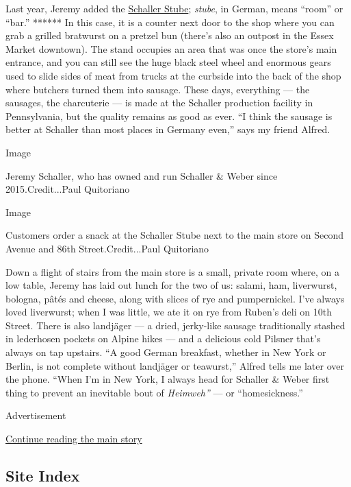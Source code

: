 Last year, Jeremy added the
\href{https://www.nytimes3xbfgragh.onion/2015/11/04/dining/hungry-city-schallers-stube-yorkville.html}{Schaller
Stube}; \emph{stube}, in German, means ``room'' or ``bar.'' ****** In
this case, it is a counter next door to the shop where you can grab a
grilled bratwurst on a pretzel bun (there's also an outpost in the Essex
Market downtown). The stand occupies an area that was once the store's
main entrance, and you can still see the huge black steel wheel and
enormous gears used to slide sides of meat from trucks at the curbside
into the back of the shop where butchers turned them into sausage. These
days, everything --- the sausages, the charcuterie --- is made at the
Schaller production facility in Pennsylvania, but the quality remains as
good as ever. ``I think the sausage is better at Schaller than most
places in Germany even,'' says my friend Alfred.

Image

Jeremy Schaller, who has owned and run Schaller \& Weber since
2015.Credit...Paul Quitoriano

Image

Customers order a snack at the Schaller Stube next to the main store on
Second Avenue and 86th Street.Credit...Paul Quitoriano

Down a flight of stairs from the main store is a small, private room
where, on a low table, Jeremy has laid out lunch for the two of us:
salami, ham, liverwurst, bologna, pâtés and cheese, along with slices of
rye and pumpernickel. I've always loved liverwurst; when I was little,
we ate it on rye from Ruben's deli on 10th Street. There is also
landjäger --- a dried, jerky-like sausage traditionally stashed in
lederhosen pockets on Alpine hikes --- and a delicious cold Pilsner
that's always on tap upstairs. ``A good German breakfast, whether in New
York or Berlin, is not complete without landjäger or teawurst,'' Alfred
tells me later over the phone. ``When I'm in New York, I always head for
Schaller \& Weber first thing to prevent an inevitable bout of
\emph{Heimweh''} --- or ``homesickness.''

Advertisement

\protect\hyperlink{after-bottom}{Continue reading the main story}

\hypertarget{site-index}{%
\subsection{Site Index}\label{site-index}}

